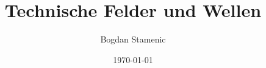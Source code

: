 

\newcommand{\FormelsammlungTitel}{Technische Felder und Wellen}
\newcommand{\FormelsammlungAutor}{Bogdan Stamenic}


	\title{\FormelsammlungTitel}
	\author{\FormelsammlungAutor}
	\date{\today}
	

